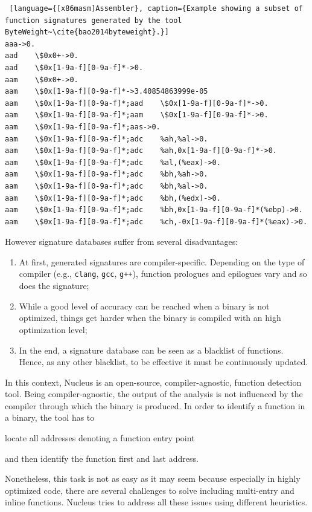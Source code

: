 \documentclass[LaM,binding=0.6cm]{sapthesis}
\begin{document}
\begin{lstlisting} [language={[x86masm]Assembler}, caption={Example showing a subset of function signatures generated by the tool ByteWeight~\cite{bao2014byteweight}.}]
aaa->0.
aad    \$0x0+->0.
aad    \$0x[1-9a-f][0-9a-f]*->0.
aam    \$0x0+->0.
aam    \$0x[1-9a-f][0-9a-f]*->3.40854863999e-05
aam    \$0x[1-9a-f][0-9a-f]*;aad    \$0x[1-9a-f][0-9a-f]*->0.
aam    \$0x[1-9a-f][0-9a-f]*;aam    \$0x[1-9a-f][0-9a-f]*->0.
aam    \$0x[1-9a-f][0-9a-f]*;aas->0.
aam    \$0x[1-9a-f][0-9a-f]*;adc    %ah,%al->0.
aam    \$0x[1-9a-f][0-9a-f]*;adc    %ah,0x[1-9a-f][0-9a-f]*->0.
aam    \$0x[1-9a-f][0-9a-f]*;adc    %al,(%eax)->0.
aam    \$0x[1-9a-f][0-9a-f]*;adc    %bh,%ah->0.
aam    \$0x[1-9a-f][0-9a-f]*;adc    %bh,%al->0.
aam    \$0x[1-9a-f][0-9a-f]*;adc    %bh,(%edx)->0.
aam    \$0x[1-9a-f][0-9a-f]*;adc    %bh,0x[1-9a-f][0-9a-f]*(%ebp)->0.
aam    \$0x[1-9a-f][0-9a-f]*;adc    %ch,-0x[1-9a-f][0-9a-f]*(%eax)->0.
\end{lstlisting}

However signature databases suffer from several disadvantages:
\begin{enumerate}
\item At first, generated signatures are compiler-specific. Depending on the type of compiler (e.g., \texttt{clang}, \texttt{gcc}, \texttt{g++}), function prologues and epilogues vary and so does the signature;
\item While a good level of accuracy can be reached when a binary is not optimized, things get harder when the binary is compiled with an high optimization level;
\item In the end, a signature database can be seen as a blacklist of functions. Hence, as any other blacklist, to be effective it must be continuously updated.
\end{enumerate}
In this context, Nucleus is an open-source, compiler-agnostic, function detection tool. Being compiler-agnostic, the output of the analysis is not influenced by the compiler through which the binary is produced. In order to identify a function in a binary, the tool has to 
\begin{enumerate*}[label=\roman*),itemjoin={,\quad}]
\item locate all addresses denoting a function entry point
\item and then identify the function first and last address.
\end{enumerate*}
Nonetheless, this task is not as easy as it may seem because especially in highly optimized code, there are several challenges to solve including multi-entry and inline functions. Nucleus tries to address all these issues using different heuristics.\\
\end{document}
